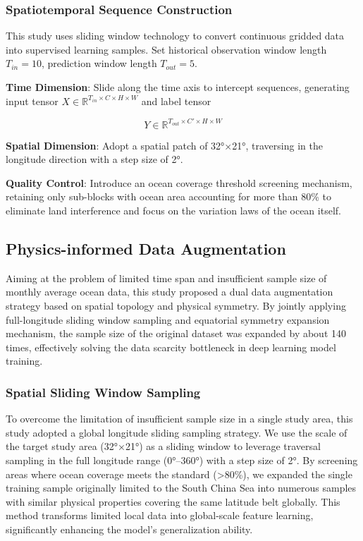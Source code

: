 \documentclass[webpdf,contemporary,large]{oup-authoring-template}
\begin{document}
\subsubsection{Spatiotemporal Sequence Construction}

This study uses sliding window technology to convert continuous gridded data into supervised learning samples. Set historical observation window length $T_{in} = 10$, prediction window length $T_{out} = 5$.

\textbf{Time Dimension}: Slide along the time axis to intercept sequences, generating input tensor $X \in \mathbb{R}^{T_{in} \times C \times H \times W}$ and label tensor

\begin{equation}
Y \in \mathbb{R}^{T_{out} \times C' \times H \times W}
\end{equation}

\textbf{Spatial Dimension}: Adopt a spatial patch of 32°×21°, traversing in the longitude direction with a step size of 2°.

\textbf{Quality Control}: Introduce an ocean coverage threshold screening mechanism, retaining only sub-blocks with ocean area accounting for more than 80\% to eliminate land interference and focus on the variation laws of the ocean itself.

\subsection{Physics-informed Data Augmentation}

Aiming at the problem of limited time span and insufficient sample size of monthly average ocean data, this study proposed a dual data augmentation strategy based on spatial topology and physical symmetry. By jointly applying full-longitude sliding window sampling and equatorial symmetry expansion mechanism, the sample size of the original dataset was expanded by about 140 times, effectively solving the data scarcity bottleneck in deep learning model training.

\subsubsection{Spatial Sliding Window Sampling}

To overcome the limitation of insufficient sample size in a single study area, this study adopted a global longitude sliding sampling strategy. We use the scale of the target study area (32°×21°) as a sliding window to leverage traversal sampling in the full longitude range (0°–360°) with a step size of 2°. By screening areas where ocean coverage meets the standard (>80\%), we expanded the single training sample originally limited to the South China Sea into numerous samples with similar physical properties covering the same latitude belt globally. This method transforms limited local data into global-scale feature learning, significantly enhancing the model's generalization ability.
\end{document}
